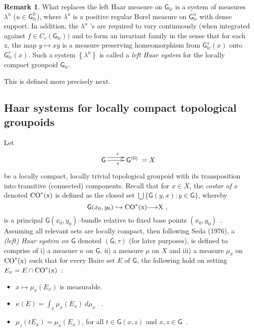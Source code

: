 \documentclass[12pt]{article}
\theoremstyle{plain}
\theoremstyle{definition}
\newtheorem{remark}{Remark}[section]
\numberwithin{equation}{section}
\newcommand{\grp}{{\mathsf{G}}}
\newcommand{\lra}{{\longrightarrow}}
\newcommand{\<}{{\langle}}
\begin{document}
\begin{remark}
 What replaces the left Haar measure on $\grp_{lc}$ is a system of measures $\lambda^u$ ($u \in \grp_{lc}^0$), where $\lambda^u$ is a positive regular Borel measure on $\grp_{lc}^u$ with dense support. In addition, the $\lambda^u$ 's are required to vary continuously (when integrated against $f \in C_c(\grp_{lc}))$ and to form an invariant family in the sense that for each x, the map $y \mapsto xy$ is a measure preserving homeomorphism from $\grp_{lc}^s(x)$ onto $\grp_{lc}^r(x)$. Such a system
$\left\{ \lambda^u \right\}$ is called a \textit{left Haar system} for the locally compact groupoid $\grp_{lc}$.
\end{remark}


 This is defined more precisely next.

\subsection{Haar systems for locally compact topological groupoids}

 Let 
\begin{equation}
\xymatrix{ \grp \ar@<1ex>[r]^r \ar[r]_s & \grp^{(0)}}=X
\end{equation}
be a locally compact, locally trivial topological groupoid with
its transposition into transitive (connected) components. Recall
that for $x \in X$, the \emph{costar of $x$} denoted
$\rm{CO}^*(x)$ is defined as the closed set $\bigcup\{ \grp(y,x) :
y \in \grp \}$, whereby
\begin{equation}
\grp(x_0, y_0) \hookrightarrow \rm{CO}^*(x) \lra X~,
\end{equation}
is a principal $\grp(x_0, y_0)$--bundle relative to
fixed base points $(x_0, y_0)$~. Assuming all relevant sets are
locally compact, then following Seda (1976), a \emph{(left) Haar
system on $\grp$} denoted $(\grp, \tau)$ (for later purposes), is
defined to comprise of i) a measure $\kappa$ on $\grp$, ii) a
measure $\mu$ on $X$ and iii) a measure $\mu_x$ on $\rm{CO}^*(x)$
such that for every Baire set $E$ of $\grp$, the following hold on
setting $E_x = E \cap \rm{CO}^*(x)$~:
\begin{itemize}
\item[(1)] $x \mapsto \mu_x(E_x)$ is measurable.


\item[(2)] $\kappa(E) = \int_x \mu_x(E_x)~d\mu_x$ ~.


\item[(3)] $\mu_z(t E_x) = \mu_x(E_x)$, for all $t \in \grp(x,z)$ and $x, z
\in \grp$~.
\end{itemize}
\end{document}

